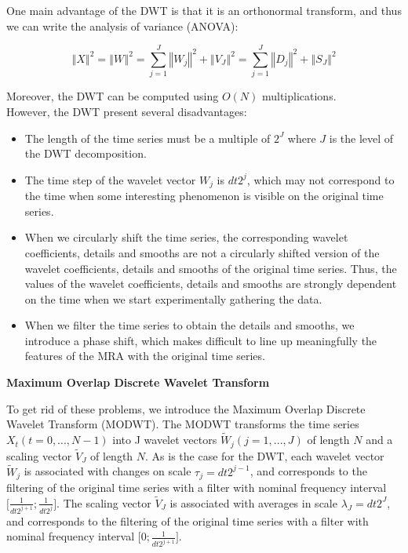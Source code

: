 \documentclass[draft]{agujournal2018}
\begin{document}
One main advantage of the DWT is that it is an orthonormal transform, and thus we can write the analysis of variance (ANOVA):

\begin{equation}
\left\Vert X \right\Vert ^2 = \left\Vert W \right\Vert ^2 = \sum_{j = 1}^{J} \left\Vert W_j \right\Vert ^2 + \left\Vert V_J \right\Vert ^2 = \sum_{j = 1}^{J} \left\Vert D_j \right\Vert ^2 + \left\Vert S_J \right\Vert ^2
\end{equation}

Moreover, the DWT can be computed using $O \left( N \right)$ multiplications. \\

However, the DWT present several disadvantages:

\begin{itemize}
	\item The length of the time series must be a multiple of $2^J$ where $J$ is the level of the DWT decomposition.
	\item The time step of the wavelet vector $W_j$ is $dt 2^j$, which may not correspond to the time when some interesting phenomenon is visible on the original time series.
	\item When we circularly shift the time series, the corresponding wavelet coefficients, details and smooths are not a circularly shifted version of the wavelet coefficients, details and smooths of the original time series. Thus, the values of the wavelet coefficients, details and smooths are strongly dependent on the time when we start experimentally gathering the data.
	\item When we filter the time series to obtain the details and smooths, we introduce a phase shift, which makes difficult to line up meaningfully the features of the MRA with the original time series.
\end{itemize}

\textbf{Maximum Overlap Discrete Wavelet Transform}

To get rid of these problems, we introduce the Maximum Overlap Discrete Wavelet Transform (MODWT). The MODWT transforms the time series $X_t \left( t = 0, ... , N - 1 \right)$ into J wavelet vectors $\widetilde{W}_j \left( j = 1 , ... , J \right)$ of length $N$ and a scaling vector $\widetilde{V}_J$ of length $N$. As is the case for the DWT, each wavelet vector $\widetilde{W}_j$ is associated with changes on scale $\tau_j = dt 2^{j - 1}$, and corresponds to the filtering of the original time series with a filter with nominal frequency interval $\lbrack \frac{1}{dt 2^{j + 1}} ; \frac{1}{dt 2^j} \rbrack$. The scaling vector $\widetilde{V}_J$ is associated with averages in scale $\lambda_J = dt 2^J$, and corresponds to the filtering of the original time series with a filter with nominal frequency interval $\lbrack 0 ; \frac{1}{dt 2^{j + 1}} \rbrack$. \\
\end{document}
